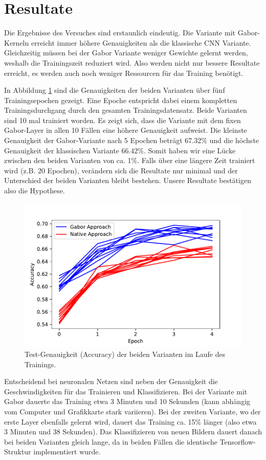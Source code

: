 \section{Resultate}

Die Ergebnisse des Versuches sind erstaunlich eindeutig.
Die Variante mit Gabor-Kerneln erreicht immer höhere Genauigkeiten als die klassische CNN Variante.
Gleichzeitig müssen bei der Gabor Variante weniger Gewichte gelernt werden, weshalb die Trainingszeit reduziert wird.
Also werden nicht nur bessere Resultate erreicht, es werden auch noch weniger Ressourcen für das Training benötigt.

In Abbildung \ref{fig:acc} sind die Genauigkeiten der beiden Varianten über fünf Trainingsepochen gezeigt.
Eine Epoche entspricht dabei einem kompletten Trainingsdurchgang durch den gesamten Trainingsdatensatz.
Beide Varianten sind 10 mal trainiert worden. 
Es zeigt sich, dass die Variante mit dem fixen Gabor-Layer in allen 10 Fällen eine höhere Genauigkeit aufweist.
Die kleinste Genauigkeit der Gabor-Variante nach 5 Epochen beträgt 67.32\% und die höchste Genauigkeit der klassischen Variante 66.42\%.
Somit haben wir eine Lücke zwischen den beiden Varianten von ca. 1\%.
Falls über eine längere Zeit trainiert wird (z.B. 20 Epochen), verändern sich die Resultate nur minimal und der Unterschied der beiden Varianten bleibt bestehen.
Unsere Resultate bestätigen also die Hypothese.

\begin{figure}
	\centering
	\includegraphics[width=0.7\linewidth]{./papers/visuell/images/accuracy}
	\caption{Test-Genauigkeit (Accuracy) der beiden Varianten im Laufe des Trainings.}
	\label{fig:acc}
\end{figure}

Entscheidend bei neuronalen Netzen sind neben der Genauigkeit die Geschwindigkeiten für das Trainieren und Klassifizieren.
Bei der Variante mit Gabor dauerte das Training etwa 3 Minuten und 10 Sekunden (kann abhängig vom Computer und Grafikkarte stark variieren).
Bei der zweiten Variante, wo der erste Layer ebenfalls gelernt wird, dauert das Training ca. 15\% länger (also etwa 3 Minuten und 38 Sekunden).
Das Klassifizieren von neuen Bildern dauert danach bei beiden Varianten gleich lange, da in beiden Fällen die identische Tensorflow-Struktur implementiert wurde.

